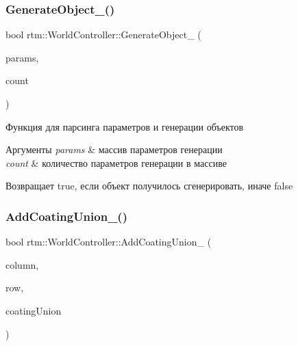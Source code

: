 \subsubsection{\texorpdfstring{Generate\+Object\+\_\+()}{GenerateObject\_()}}
{\footnotesize\ttfamily bool rtm\+::\+World\+Controller\+::\+Generate\+Object\+\_\+ (\begin{DoxyParamCaption}\item[{uint8\+\_\+t $\ast$}]{params,  }\item[{uint8\+\_\+t}]{count }\end{DoxyParamCaption})\hspace{0.3cm}{\ttfamily [private]}}



Функция для парсинга параметров и генерации объектов 


\begin{DoxyParams}{Аргументы}
{\em params} & массив параметров генерации \\
\hline
{\em count} & количество параметров генерации в массиве \\
\hline
\end{DoxyParams}
\begin{DoxyReturn}{Возвращает}
true, если объект получилось сгенерировать, иначе false 
\end{DoxyReturn}
\mbox{\label{classrtm_1_1_world_controller_a6639efb9bada52ca44f485482e7b0e70}} 
\subsubsection{\texorpdfstring{Add\+Coating\+Union\+\_\+()}{AddCoatingUnion\_()}}
{\footnotesize\ttfamily bool rtm\+::\+World\+Controller\+::\+Add\+Coating\+Union\+\_\+ (\begin{DoxyParamCaption}\item[{int}]{column,  }\item[{int}]{row,  }\item[{\hyperlink{namespacertm_a0b1daa4ff7c2591d8433d441f9e56e4c}{Coating\+Union\+Shared}}]{coating\+Union }\end{DoxyParamCaption})\hspace{0.3cm}{\ttfamily [private]}}



